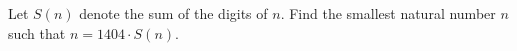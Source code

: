 Let $S(n)$ denote the sum of the digits of $n$. Find the smallest natural number $n$ such that $n=1404 \cdot S(n)$.
